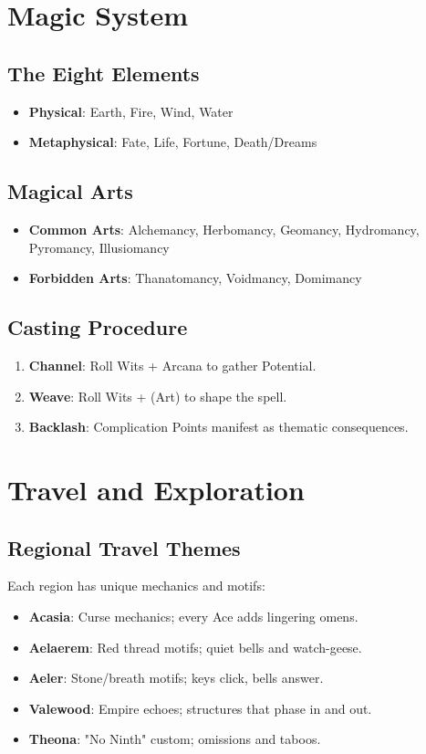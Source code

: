 \documentclass[11pt,twoside]{article}
\begin{document}
\section{Magic System}

\subsection{The Eight Elements}
\begin{itemize}[leftmargin=*]
    \item \textbf{Physical}: Earth, Fire, Wind, Water
    \item \textbf{Metaphysical}: Fate, Life, Fortune, Death/Dreams
\end{itemize}

\subsection{Magical Arts}
\begin{itemize}[leftmargin=*]
    \item \textbf{Common Arts}: Alchemancy, Herbomancy, Geomancy, Hydromancy, Pyromancy, Illusiomancy
    \item \textbf{Forbidden Arts}: Thanatomancy, Voidmancy, Domimancy
\end{itemize}

\subsection{Casting Procedure}
\begin{enumerate}[leftmargin=*]
    \item \textbf{Channel}: Roll Wits + Arcana to gather Potential.
    \item \textbf{Weave}: Roll Wits + (Art) to shape the spell.
    \item \textbf{Backlash}: Complication Points manifest as thematic consequences.
\end{enumerate}

\section{Travel and Exploration}

\subsection{Regional Travel Themes}
Each region has unique mechanics and motifs:
\begin{itemize}[leftmargin=*]
    \item \textbf{Acasia}: Curse mechanics; every Ace adds lingering omens.
    \item \textbf{Aelaerem}: Red thread motifs; quiet bells and watch-geese.
    \item \textbf{Aeler}: Stone/breath motifs; keys click, bells answer.
    \item \textbf{Valewood}: Empire echoes; structures that phase in and out.
    \item \textbf{Theona}: "No Ninth" custom; omissions and taboos.
\end{itemize}
\end{document}
